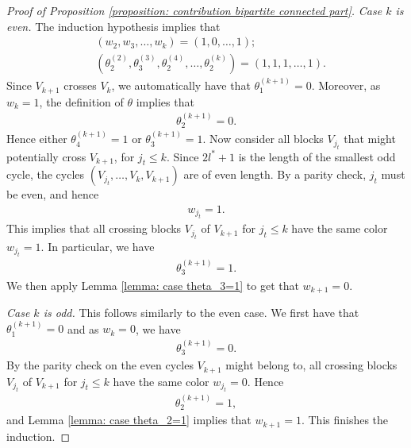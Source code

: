 \documentclass[12pt,reqno]{amsart}
\theoremstyle{plain}
\newcommand{\1}{\mathbf{1}}
\begin{document}
\begin{proof}[Proof of Proposition \ref{proposition: contribution bipartite connected part}]
    \textit{Case $k$ is even.} The induction hypothesis implies that
    \begin{align*}
        &(w_2,w_3,\ldots,w_k)=(1,0,\ldots,1);\\
        &\left(\theta^{(2)}_2,\theta^{(3)}_3,\theta^{(4)}_2,\ldots,\theta^{(k)}_2\right)=(1,1,1,\ldots,1).
    \end{align*}
    Since $V_{k+1}$ crosses $V_k$, we automatically have that $\theta^{(k+1)}_1=0$. Moreover, as $w_k=1$, the definition of $\theta$ implies that
    \begin{align*}
        \theta^{(k+1)}_2=0.
    \end{align*}
    Hence either $\theta^{(k+1)}_4=1$ or $\theta^{(k+1)}_3=1$. Now consider all blocks $V_{j_t}$ that might potentially cross $V_{k+1}$, for $j_t\le k$. Since $2l^*+1$ is the length of the smallest odd cycle, the cycles $(V_{j_t},\ldots, V_{k}, V_{k+1})$ are of even length. By a parity check, $j_t$ must be even, and hence
    \begin{align*}
        w_{j_t}=1.
    \end{align*}
    This implies that all crossing blocks $V_{j_t}$ of $V_{k+1}$ for $j_t \le k$ have the same color $w_{j_t}=1$. In particular, we have
    \begin{align*}
        \theta^{(k+1)}_{3}=1.
    \end{align*}
    We then apply Lemma \ref{lemma: case theta_3=1} to get that $w_{k+1}=0$.

    \textit{Case $k$ is odd.} This follows similarly to the even case. We first have that $\theta^{(k+1)}_1=0$ and as $w_{k}=0$, we have
    \begin{align*}
        \theta^{(k+1)}_3=0.
    \end{align*}
    By the parity check on the even cycles $V_{k+1}$ might belong to, all crossing blocks $V_{j_t}$ of $V_{k+1}$ for $j_t \le k$ have the same color $w_{j_t}=0$. Hence
    \begin{align*}
        \theta^{(k+1)}_2=1,
    \end{align*}
    and Lemma \ref{lemma: case theta_2=1} implies that $w_{k+1}=1$. This finishes the induction.


\end{proof}
\end{document}
